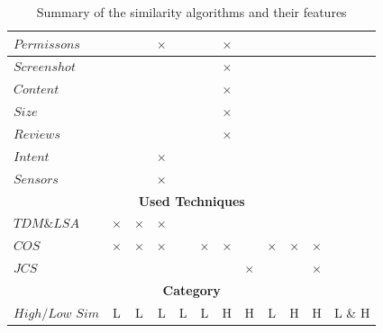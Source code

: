 \begin{landscape}
\begin{table}[htbp]
\begin{tabular}{|p{1.6cm}|c|c|c|c|c|c|c|c|c|c|c|}
			$Permissons$ &  &  & $\times$ &  &  & $\times$ &  &  &  &  &  \\\hline
			$Screenshot$ &  &  &  &  &  & $\times$ &  &  &  &   & \\\hline
			$Content$ &  &  &  &  &  & $\times$ &  &  &  &  & \\\hline
			$Size$ &  &  &  &  &  & $\times$ &  &  &  &   & \\\hline
			$Reviews$ &  &  &  &  &  & $\times$ &  &  &  & & \\\hline
			$Intent$ &  &  & $\times$ &  &  &  &  &   &   & & \\\hline
			$Sensors$ &  &  & $\times$ &  &  &  &  &  &   & & \\\hline
			
			\multicolumn{12}{|c|}{\bf Used Techniques} \\ \cline{1-12}
			$TDM \& LSA$ & $\times$ & $\times$ & $\times$ &  &  &  &  &  &   &  & \\\hline
			$COS$ & $\times$ & $\times$ & $\times$ &  & $\times$ & $\times$ &  & $\times$  &  $\times$ & $\times$  & \\\hline
			$JCS$ &  &  &  &  &  &  & $\times$ &  &  & $\times$ & \\\hline
			
			\multicolumn{12}{|c|}{\bf Category}  \\ \cline{1-12}
			$High/Low$ $Sim$ & L & L & L & L & L & H & H & L & H  & H  & L \& H \\\hline
			
		\end{tabular}
		\caption{Summary of the similarity algorithms and their features}
		\label{tbl:AlgorithmsAndFeatures}
	\end{table}	
\end{landscape}


